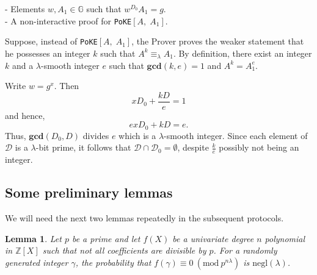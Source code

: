 \documentclass[11pt, lettersize, notitlepage, leqno, footskip=0.6cm]{article}
\newcommand{\bz}{\mathbb Z}
\newcommand{\negl}{\mr{negl}}
\newcommand{\eqlam}{\equiv_{\lam}}
\newcommand{\mc}{\mathcal}
\newcommand{\mb}{\mathbb}
\newcommand{\mbf}{\mathbf}
\newcommand{\mr}{\mathrm}
\newcommand{\lam}{\lambda}
\newcommand{\vs}{\vspace{-0.15cm}}
\newcommand{\noin}{\noindent}
\newcommand{\Mod}[1]{\ (\mathrm{mod}\ #1)}
\newcommand{\GCD}{\mbf{gcd}}
\newtheorem{Lem}[Thm]{Lemma}
\numberwithin{equation}{section}
\begin{document}
\noin - Elements $w, A_1\in\mb{G}$ such that $w^{D_0}A_1 = g$.\\
- A non-interactive proof for \verb|PoKE|$[A,\; A_1]$.

Suppose, instead of \verb|PoKE|$[A,\; A_1]$, the Prover proves the weaker statement that he possesses an integer $k$ such that $A^k \eqlam A_1$. By definition, there exist an integer $k$ and a $\lam$-smooth integer $e$ such that $\GCD(k,e) = 1$ and $A^{k} = A_1^e$.

Write $w = g^x$. Then \vs $$ x D_0 +  
\frac{kD}{e} = 1 $$ and hence, \vs $$ex D_0 +  kD = e .$$ Thus, $\GCD(D_0, D)$ divides $e$ which is a $\lam$-smooth integer. Since each element of $\mc{D}$ is a $\lam$-bit prime, it follows that $\mc{D}\cap \mc{D}_0 = \emptyset$, despite $\frac{k}{e}$ possibly not being an integer.

\subsection{\fontsize{11}{11}\selectfont Some preliminary lemmas }

\noin We will need the next two lemmas repeatedly in the subsequent protocols.

\begin{Lem} Let $p$ be a prime and let $f(X)$ be a univariate degree $n$ polynomial in $\bz[X]$ such that not all coefficients are divisible by $p$. For a randomly generated integer $\gamma$, the probability that $f(\gamma)\equiv 0\Mod{p^{n\lam}}$ is $\negl(\lam)$.
\end{Lem}
\end{document}
